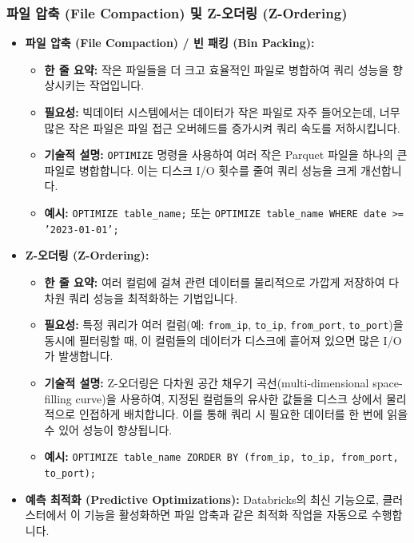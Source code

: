 \documentclass[11pt,a4paper]{article}
\theoremstyle{definition}
\begin{document}
\subsubsection{파일 압축 (File Compaction) 및 Z-오더링 (Z-Ordering)}
\begin{itemize}
    \item \textbf{파일 압축 (File Compaction) / 빈 패킹 (Bin Packing):}
    \begin{itemize}
        \item \textbf{한 줄 요약:} 작은 파일들을 더 크고 효율적인 파일로 병합하여 쿼리 성능을 향상시키는 작업입니다.
        \item \textbf{필요성:} 빅데이터 시스템에서는 데이터가 작은 파일로 자주 들어오는데, 너무 많은 작은 파일은 파일 접근 오버헤드를 증가시켜 쿼리 속도를 저하시킵니다.
        \item \textbf{기술적 설명:} \texttt{OPTIMIZE} 명령을 사용하여 여러 작은 Parquet 파일을 하나의 큰 파일로 병합합니다. 이는 디스크 I/O 횟수를 줄여 쿼리 성능을 크게 개선합니다.
        \item \textbf{예시:} \texttt{OPTIMIZE table_name;} 또는 \texttt{OPTIMIZE table_name WHERE date >= '2023-01-01';}
    \end{itemize}
    \item \textbf{Z-오더링 (Z-Ordering):}
    \begin{itemize}
        \item \textbf{한 줄 요약:} 여러 컬럼에 걸쳐 관련 데이터를 물리적으로 가깝게 저장하여 다차원 쿼리 성능을 최적화하는 기법입니다.
        \item \textbf{필요성:} 특정 쿼리가 여러 컬럼(예: \texttt{from_ip}, \texttt{to_ip}, \texttt{from_port}, \texttt{to_port})을 동시에 필터링할 때, 이 컬럼들의 데이터가 디스크에 흩어져 있으면 많은 I/O가 발생합니다.
        \item \textbf{기술적 설명:} Z-오더링은 다차원 공간 채우기 곡선(multi-dimensional space-filling curve)을 사용하여, 지정된 컬럼들의 유사한 값들을 디스크 상에서 물리적으로 인접하게 배치합니다. 이를 통해 쿼리 시 필요한 데이터를 한 번에 읽을 수 있어 성능이 향상됩니다.
        \item \textbf{예시:} \texttt{OPTIMIZE table_name ZORDER BY (from_ip, to_ip, from_port, to_port);}
    \end{itemize}
    \item \textbf{예측 최적화 (Predictive Optimizations):} Databricks의 최신 기능으로, 클러스터에서 이 기능을 활성화하면 파일 압축과 같은 최적화 작업을 자동으로 수행합니다.
\end{itemize}
\end{document}
